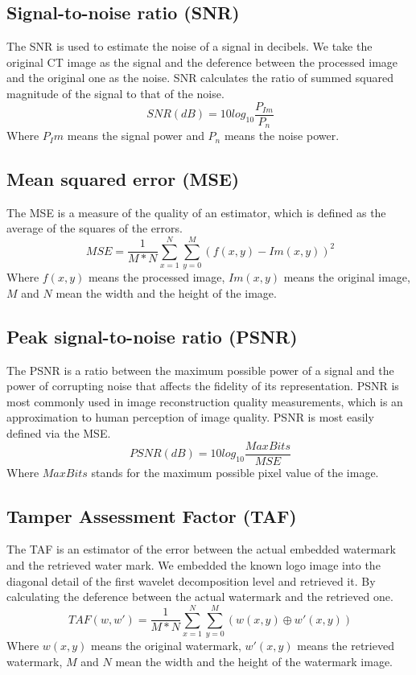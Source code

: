 \documentclass[letterpaper, 10 pt, conference]{ieeeconf}  %
\begin{document}
\subsection{Signal-to-noise ratio (SNR)}
The SNR is used to estimate the noise of a signal in decibels. We take the original CT image as the signal and the deference between the processed image and the original one as the noise. SNR calculates the ratio of summed squared magnitude of the signal to that of the noise.
\[\ SNR(dB) = 10 log_{10} \frac{P_{Im}}{P_n}\]
Where $P_Im$ means the signal power and $P_n$ means the noise power.\\

\subsection{Mean squared error (MSE)}
The MSE is a measure of the quality of an estimator, which is defined as the average of the squares of the errors.
\[\ MSE = \frac{1}{M * N} \sum_{x=1}^{N}\sum_{y=0}^{M}(f(x,y)-Im(x,y))^2\]
Where $f(x,y)$ means the processed image, $Im(x,y)$ means the original image, $M$ and $N$ mean the width and the height of the image.\\

\subsection{Peak signal-to-noise ratio (PSNR)}
The PSNR is a ratio between the maximum possible power of a signal and the power of corrupting noise that affects the fidelity of its representation. PSNR is most commonly used in image reconstruction quality measurements, which is an approximation to human perception of image quality. PSNR is most easily defined via the MSE.
\[\ PSNR(dB) = 10 log_{10} \frac{MaxBits}{MSE}\]
Where $MaxBits$ stands for the maximum possible pixel value of the image.\\

\subsection{Tamper Assessment Factor (TAF)}
The TAF is an estimator of the error between the actual embedded watermark and the retrieved water mark. We embedded the known logo image into the diagonal detail of the first wavelet decomposition level and retrieved it. By calculating the deference between the actual watermark and the retrieved one.
\[\ TAF(w,w') = \frac{1}{M * N} \sum_{x=1}^{N}\sum_{y=0}^{M}(w(x,y)\oplus w'(x,y))\]
Where $w(x,y)$ means the original watermark, $w'(x,y)$ means the retrieved watermark, $M$ and $N$ mean the width and the height of the watermark image.\\
\end{document}
